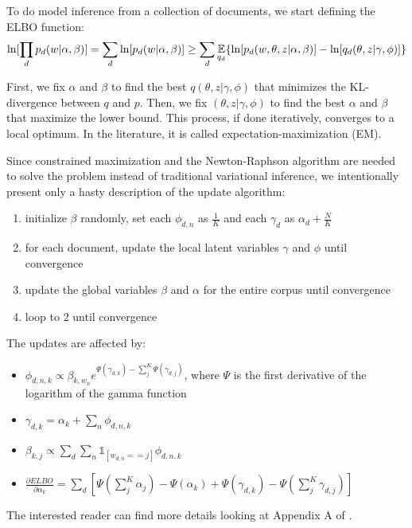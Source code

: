 To do model inference from a collection of documents, we start defining the ELBO function:
\begin{equation*}
    \ln[\prod_d p_d(w | \alpha, \beta)] = \sum_d \ln [p_d(w | \alpha, \beta)] \geq \sum_d \operatorname*{\mathbb{E}}_{q_d} \{ \ln[p_d(w, \theta, z | \alpha, \beta)] - \ln[q_d(\theta, z | \gamma, \phi)] \}
\end{equation*}

First, we fix $\alpha$ and $\beta$ to find the best $q(\theta, z | \gamma, \phi)$ that minimizes the KL-divergence between $q$ and $p$.
Then, we fix $(\theta, z | \gamma, \phi)$ to find the best $\alpha$ and $\beta$ that maximize the lower bound.
This process, if done iteratively, converges to a local optimum.
In the literature, it is called expectation-maximization (EM).

Since constrained maximization and
the Newton-Raphson algorithm are needed to solve the problem
instead of traditional variational inference,
we intentionally present only a hasty description of the update algorithm:
\begin{enumerate}
    \item initialize $\beta$ randomly, set each $\phi_{d,n}$ as $\frac{1}{K}$ and each $\gamma_d$ as $\alpha_d + \frac{N}{K}$
    \item for each document, update the local latent variables $\gamma$ and $\phi$ until convergence
    \item update the global variables $\beta$ and $\alpha$ for the entire corpus until convergence
    \item loop to 2 until convergence
\end{enumerate}

The updates are affected by:
\begin{itemize}
    \item $\phi_{d,n,k} \propto \beta_{k, w_n} e^{\Psi(\gamma_{d,k}) - \sum_j^K \Psi(\gamma_{d,j})}$, where $\Psi$ is the first derivative of the logarithm of the gamma function
    \item $\gamma_{d,k} = \alpha_k + \sum_n \phi_{d,n,k}$
    \item $\beta_{k,j} \propto \sum_d \sum_n \mathbb{1}_{[w_{d,n} == j]} \phi_{d,n,k}$
    \item $\frac{\partial \mathit{ELBO}}{ \partial \alpha_k} = \sum_d [ \Psi(\sum_j^K \alpha_j) - \Psi(\alpha_k) + \Psi(\gamma_{d,k}) - \Psi(\sum_j^K \gamma_{d,j})]$
\end{itemize}

The interested reader can find more details looking at Appendix A of \cite{DBLP:journals/jmlr/BleiNJ03}.


